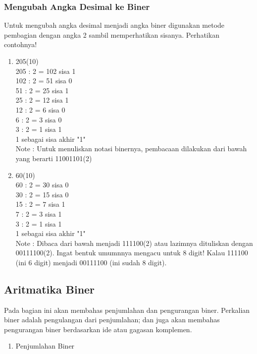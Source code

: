 \documentclass{article}
\begin{document}
\begin{enumerate}
\subsubsection {Mengubah Angka Desimal ke Biner} 
Untuk mengubah angka desimal menjadi angka biner digunakan metode pembagian dengan angka 2 sambil memperhatikan sisanya. 
Perhatikan contohnya! 
\begin{enumerate}
\item 205(10)\\
205 : 2 = 102 sisa 1\\ 
102 : 2 = 51 sisa 0 \\
51 : 2 = 25 sisa 1\\
25 : 2 = 12 sisa 1 \\
12 : 2 = 6 sisa 0 \\
6 : 2 = 3 sisa 0 \\
3 : 2 = 1 sisa 1 \\
1 \textrightarrow sebagai sisa akhir "1"\\
Note :
Untuk menuliskan notasi binernya, pembacaan dilakukan dari bawah yang berarti 11001101(2) 

\item 60(10)\\
60 : 2 = 30 sisa 0\\ 
30 : 2 = 15 sisa 0 \\
15 : 2 = 7 sisa 1 \\
7 : 2 = 3 sisa 1 \\
3 : 2 = 1 sisa 1 \\
1 \textrightarrow sebagai sisa akhir "1"\\
Note :
Dibaca dari bawah menjadi 111100(2) atau lazimnya dituliskan dengan 00111100(2). Ingat bentuk umumnnya mengacu untuk 8 digit! Kalau 111100 (ini 6 digit) menjadi 00111100 (ini sudah 8 digit). 

\end{enumerate}

\subsection{Aritmatika Biner}

Pada bagian ini akan membahas penjumlahan dan pengurangan biner. Perkalian biner adalah pengulangan dari penjumlahan; dan juga akan membahas pengurangan biner berdasarkan ide atau gagasan komplemen.

\begin{enumerate}

\item Penjumlahan Biner


\end{enumerate}
\end{enumerate}
\end{document}

